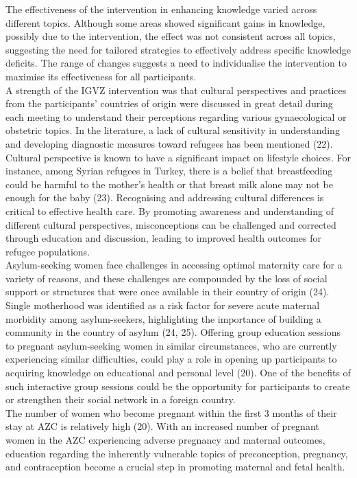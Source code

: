 \documentclass[12pt]{article}
\begin{document}
\noindent The effectiveness of the intervention in enhancing knowledge varied across different topics. Although some areas showed significant gains in knowledge, possibly due to the intervention, the effect was not consistent across all topics, suggesting the need for tailored strategies to effectively address specific knowledge deficits. The range of changes suggests a need to individualise the intervention to maximise its effectiveness for all participants. \\ 

\noindent A strength of the IGVZ intervention was that cultural perspectives and practices from the participants' countries of origin were discussed in great detail during each meeting to understand their perceptions regarding various gynaecological or obstetric topics.  In the literature, a lack of cultural sensitivity in understanding and developing diagnostic measures toward refugees has been mentioned (22). Cultural perspective is known to have a significant impact on lifestyle choices. For instance, among Syrian refugees in Turkey, there is a belief that breastfeeding could be harmful to the mother's health or that breast milk alone may not be enough for the baby (23). Recognising and addressing cultural differences is critical to effective health care. By promoting awareness and understanding of different cultural perspectives, misconceptions can be challenged and corrected through education and discussion, leading to improved health outcomes for refugee populations.\\

\noindent Asylum-seeking women face challenges in accessing optimal maternity care for a variety of reasons, and these challenges are compounded by the loss of social support or structures that were once available in their country of origin (24). Single motherhood was identified as a risk factor for severe acute maternal morbidity among asylum-seekers, highlighting the importance of building a community in the country of asylum (24, 25). Offering group education sessions to pregnant asylum-seeking women in similar circumstances, who are currently experiencing similar difficulties, could play a role in opening up participants to acquiring knowledge on educational and personal level (20). One of the benefits of such interactive group sessions could be the opportunity for participants to create or strengthen their social network in a foreign country. \\

\noindent The number of women who become pregnant within the first 3 months of their stay at AZC is relatively high (20). With an increased number of pregnant women in the AZC experiencing adverse pregnancy and maternal outcomes, education regarding the inherently vulnerable topics of preconception, pregnancy, and contraception become a crucial step in promoting maternal and fetal health. \\
\end{document}

